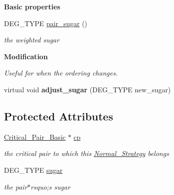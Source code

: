 \begin{Indent}\textbf{ Basic properties}\par
\begin{DoxyCompactItemize}
\item 
\mbox{\label{class_pair___w_sugar___strategy_abaf1d3aa2eb6b7fef429be8f27e2c7b8}} 
D\+E\+G\+\_\+\+T\+Y\+PE \hyperlink{class_pair___w_sugar___strategy_abaf1d3aa2eb6b7fef429be8f27e2c7b8}{pair\+\_\+sugar} ()
\begin{DoxyCompactList}\small\item\em the weighted sugar \end{DoxyCompactList}\end{DoxyCompactItemize}
\end{Indent}
\begin{Indent}\textbf{ Modification}\par
{\em Useful for when the ordering changes. }\begin{DoxyCompactItemize}
\item 
\mbox{\label{class_pair___w_sugar___strategy_a5288aef295d144401e9c0a7c08c40a66}} 
virtual void {\bfseries adjust\+\_\+sugar} (D\+E\+G\+\_\+\+T\+Y\+PE new\+\_\+sugar)
\end{DoxyCompactItemize}
\end{Indent}
\subsection*{Protected Attributes}
\begin{DoxyCompactItemize}
\item 
\mbox{\label{class_pair___w_sugar___strategy_ad64f04d4feffa02e64ff4837b55a7def}} 
\hyperlink{class_critical___pair___basic}{Critical\+\_\+\+Pair\+\_\+\+Basic} $\ast$ \hyperlink{class_pair___w_sugar___strategy_ad64f04d4feffa02e64ff4837b55a7def}{cp}
\begin{DoxyCompactList}\small\item\em the critical pair to which this {\ttfamily \hyperlink{class_normal___strategy}{Normal\+\_\+\+Strategy}} belongs \end{DoxyCompactList}\item 
\mbox{\label{class_pair___w_sugar___strategy_a6bd5a8eb9113fd93475c06e30da44bb8}} 
D\+E\+G\+\_\+\+T\+Y\+PE \hyperlink{class_pair___w_sugar___strategy_a6bd5a8eb9113fd93475c06e30da44bb8}{sugar}
\begin{DoxyCompactList}\small\item\em the pair$\ast$rsquo;s sugar \end{DoxyCompactList}\end{DoxyCompactItemize}


